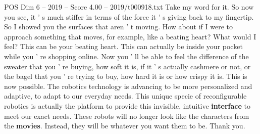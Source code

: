 \begin{textsample}{POS Dim 6 – 2019 – Score 4.00 – 2019/t000918.txt}
Take my word for it.
So now you see, it ' s much stiffer in terms of the force it ' s giving back to my fingertip.
So I showed you the surfaces that aren ' t moving.
How about if I were to approach something that moves, for example, like a beating heart?
What would I feel?
This can be your beating heart.
This can actually be inside your pocket while you ' re shopping online.
Now you ' ll be able to feel the difference of the sweater that you ' re buying, how soft it is, if it ' s actually cashmere or not, or the bagel that you ' re trying to buy, how hard it is or how crispy it is.
This is now possible.
The robotics technology is advancing to be more personalized and adaptive, to adapt to our everyday needs.
This unique specie of reconfigurable robotics is actually the platform to provide this invisible, intuitive \textbf{interface} to meet our exact needs.
These robots will no longer look like the characters from the \textbf{movies}.
Instead, they will be whatever you want them to be.
Thank you.

\end{textsample}
